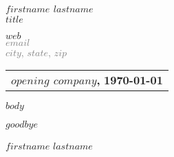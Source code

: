 \documentclass[$size$]{article}
\begin{document}
\begin{center}
    {\Large \textbf{$firstname$ $lastname$}}\\
    \textbf{$title$}
\end{center}

\bigskip

\noindent
\begin{flushright}
\textcolor{gray}
{
\href{$web$}{$web$} \\
$email$ \\
$city$, $state$, $zip$
}
\end{flushright}

\bigskip

\noindent
\begin{tabular}{@{}p{\textwidth}}
\textbf{$opening$ $company$,} \hfill \textbf{\today}
\end{tabular}

\bigskip

$body$

\noindent
$goodbye$

$firstname$ $lastname$

\bigskip

\noindent
\end{document}
